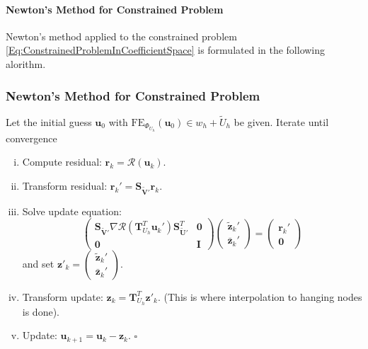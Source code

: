 \paragraph{Newton's Method for Constrained Problem}

Newton's method applied to the constrained
problem \eqref{Eq:ConstrainedProblemInCoefficientSpace} is formulated
in the following alorithm.

\begin{frame}
\frametitle<presentation>{Newton's Method for Constrained Problem}
\begin{Alg}\label{algo:ConstrainedNewton}
Let the initial guess $\mathbf{u}_{0}$ with
$\text{FE}_{\Phi_{U_h}}(\mathbf{u}_{0}) \in w_h + \tilde{U}_h$ be given.
Iterate until convergence
\begin{enumerate}[i)]
\item Compute residual:
  $\mathbf{r}_k=\mathcal{R}\left(\mathbf{u}_{k}\right)$.
\item Transform residual: $\mathbf{r}_k' = \mathbf{S}_{\tilde{\mathbf{V}}'}
  \mathbf{r}_k$.
\item Solve update equation:
\begin{equation*}
\left(\begin{array}{cc}
\mathbf{S}_{\tilde{\mathbf{V}}'} \nabla
\mathcal{R}\left(\mathbf{T}^T_{U_h}\mathbf{u}_{k}'\right)
\mathbf{S}^T_{\tilde{\mathbf{U}}'} & \mathbf{0}\\
\mathbf{0} & \mathbf{I}
\end{array}\right)
\left(\begin{array}{c}
\tilde{\mathbf{z}}_{k}'\\
\bar{\mathbf{z}}_{k}'
\end{array}\right) =
\left(\begin{array}{c}
\mathbf{r}_k'\\
\mathbf{0}
\end{array}\right)
\end{equation*}
and set $\mathbf{z}'_{k} = \left(\begin{smallmatrix}
\tilde{\mathbf{z}}_{k}'\\ \bar{\mathbf{z}}_{k}'
\end{smallmatrix}\right)$.
\item Transform update: $\mathbf{z}_{k} =
  \mathbf{T}^T_{U_h}\mathbf{z}'_k$. (This is where interpolation to
  hanging nodes is done).
\item Update: $\mathbf{u}_{k+1} = \mathbf{u}_k
- \mathbf{z}_k$. \hfill$\square$
\end{enumerate}
\end{Alg}
\end{frame}


